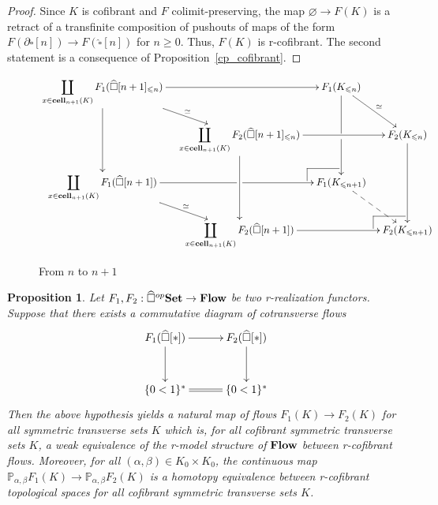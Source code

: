 \documentclass[a4paper,12pt]{amsart}
\makeatletter
\newcommand{\de}{\partial}
\newcommand{\p}{\times}
\newtheorem{prop}[thm]{Proposition}
\newcommand{\bp}{\begin{prop}}
\newcommand{\ep}{\end{prop}}
\newcommand{\bpf}{\begin{proof}}
\newcommand{\epf}{\end{proof}}
\theoremstyle{definition}
\newcommand{\fr}[1]{\ar@{->}[r]^-{#1}}
\newcommand{\fd}[1]{\ar@{->}[d]_-{#1}}
\renewcommand{\leq}{\leqslant}
\renewcommand{\geq}{\geqslant}
\def\cocartesien{%
	\ar@{-}[]+L+<-6pt,+2pt>;[]+LU+<-6pt,+6pt>%
	\ar@{-}[]+U+<-2pt,+6pt>;[]+LU+<-6pt,+6pt>%
}
\newcommand{\brm}[1]{{\rm{\mathbf{#1}}}}
\newcommand{\dtop}{{\brm{Flow}}}
\newcommand{\set}{{\brm{Set}}}
\renewcommand{\P}{\mathbb{P}}
\DeclareMathOperator{\cell}{{\brm{cell}}}
\makeatother
\begin{document}
\bpf
Since $K$ is cofibrant and $F$ colimit-preserving, the map $\varnothing \to F(K)$ is a retract of a transfinite composition of pushouts of maps of the form  $F(\de\widehat{\square}[n])\to F(\widehat{\square}[n])$ for $n\geq 0$. Thus, $F(K)$ is r-cofibrant. The second statement is a consequence of Proposition~\ref{cp_cofibrant}. 
\epf

\begin{figure}
	\[{%
		\xymatrix@C=1em@R=1.5em{ \displaystyle\coprod\limits_{x\in \cell_{n+1}(K)} F_1(\widehat{\square}[n+1]_{\leq n})
			\ar@{->}[rd]^-{\simeq} \ar@{->}[dd] \ar@{->}[rr] && F_1(K_{\leq
				n})
			\ar@{->}[rd]^-{\simeq} \ar@{->}'[d][dd]  &\\
			& \displaystyle\coprod\limits_{x\in \cell_{n+1}(K)}
			F_2(\widehat{\square}[n+1]_{\leq n}) \ar@{->}[rr] \ar@{->}[dd] && F_2(K_{\leq n}) \ar@{->}[dd] \\
			\displaystyle\coprod\limits_{x\in \cell_{n+1}(K)}
			F_1(\widehat{\square}[n+1]) \ar@{->}[rd]^-{\simeq} \ar@{->}'[r][rr] &&
			\cocartesien F_1(K_{\leq n+1}) \ar@{-->}[rd]^-{}& \\
			& \displaystyle\coprod\limits_{x\in \cell_{n+1}(K)} F_2(\widehat{\square}[n+1]) \ar@{->}[rr] &&
			\cocartesien F_2(K_{\leq n+1})}
	} \]
	\caption{From $n$ to $n+1$}
	\label{passage}
\end{figure}

\bp \label{elm2}
Let $F_1,F_2:\widehat{\square}^{op}\set \to \dtop$ be two r-realization functors. Suppose that there exists a commutative diagram of cotransverse flows 
\[
\xymatrix@C=3em@R=3em
{
	F_1(\widehat{\square}[*]) \fr{} \fd{} & F_2(\widehat{\square}[*]) \fd{} \\
	\{0<1\}^* \ar@{=}[r] & \{0<1\}^*
}
\]
Then the above hypothesis yields a natural map of flows $F_1(K)\to F_2(K)$ for all symmetric transverse sets $K$ which is, for all cofibrant symmetric transverse sets $K$, a weak equivalence of the r-model structure of $\dtop$ between r-cofibrant flows. Moreover, for all $(\alpha,\beta)\in K_0\p K_0$, the continuous map $\P_{\alpha,\beta}F_1(K)\to \P_{\alpha,\beta}F_2(K)$ is a homotopy equivalence between r-cofibrant topological spaces for all cofibrant symmetric transverse sets $K$. 
\ep
\end{document}
